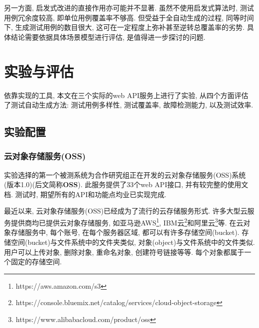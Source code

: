         另一方面, 启发式改进的直接作用亦可能并不显著. 虽然不使用启发式算法时, 测试用例冗余度较高, 即单位用例覆盖率不够高. 但受益于全自动生成的过程, 同等时间下, 生成测试用例的数目很大, 这可在一定程度上弥补甚至逆转总覆盖率的劣势. 具体结论需要依据具体场景模型进行评估, 是值得进一步探讨的问题.
    

    \section{实验与评估}

        \label{sec:experiment}

        依靠实现的工具, 本文在三个实际的web API服务上进行了实验, 从四个方面评估了测试自动生成方法: 测试用例多样性, 测试覆盖率, 故障检测能力, 以及测试效率.
    
        \subsection{实验配置}
            \subsubsection*{云对象存储服务(OSS)}
                实验选择的第一个被测系统为合作研究组正在开发的云对象存储服务(OSS)系统(版本1.0)(后文简称\textbf{OSS}). 此服务提供了33个web API接口, 并有较完整的使用文档. 测试时, 期望所有的API和功能点均业已实现完成.
                
                最近以来, 云对象存储服务(OSS)已经成为了流行的云存储服务形式. 许多大型云服务提供商均已提供云对象存储服务, 如亚马逊AWS\footnote{https://aws.amazon.com/s3}, IBM云\footnote{ https://console.bluemix.net/catalog/services/cloud-object-storage}和阿里云\footnote{ https://www.alibabacloud.com/product/oss}等. 在云对象存储服务中, 每个账号, 在每个服务器区域, 都可以有许多存储空间(bucket). 存储空间(bucket)与文件系统中的文件夹类似, 对象(object)与文件系统中的文件类似. 用户可以上传对象, 删除对象, 重命名对象, 创建符号链接等等. 每个对象都属于一个固定的存储空间.
                
